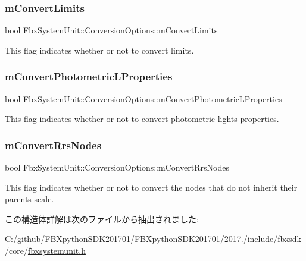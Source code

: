 \subsubsection{\texorpdfstring{m\+Convert\+Limits}{mConvertLimits}}
{\footnotesize\ttfamily bool Fbx\+System\+Unit\+::\+Conversion\+Options\+::m\+Convert\+Limits}



This flag indicates whether or not to convert limits. 

\mbox{\label{struct_fbx_system_unit_1_1_conversion_options_ac2bf3b13865eaaa9c6eecb5f696bc8d6}} 
\subsubsection{\texorpdfstring{m\+Convert\+Photometric\+L\+Properties}{mConvertPhotometricLProperties}}
{\footnotesize\ttfamily bool Fbx\+System\+Unit\+::\+Conversion\+Options\+::m\+Convert\+Photometric\+L\+Properties}



This flag indicates whether or not to convert photometric lights properties. 

\mbox{\label{struct_fbx_system_unit_1_1_conversion_options_a0043e009bb8b31f946395185a40f479d}} 
\subsubsection{\texorpdfstring{m\+Convert\+Rrs\+Nodes}{mConvertRrsNodes}}
{\footnotesize\ttfamily bool Fbx\+System\+Unit\+::\+Conversion\+Options\+::m\+Convert\+Rrs\+Nodes}



This flag indicates whether or not to convert the nodes that do not inherit their parent\textquotesingle{}s scale. 



この構造体詳解は次のファイルから抽出されました\+:\begin{DoxyCompactItemize}
\item 
C\+:/github/\+F\+B\+Xpython\+S\+D\+K201701/\+F\+B\+Xpython\+S\+D\+K201701/2017./include/fbxsdk/core/\hyperlink{fbxsystemunit_8h}{fbxsystemunit.\+h}\end{DoxyCompactItemize}
